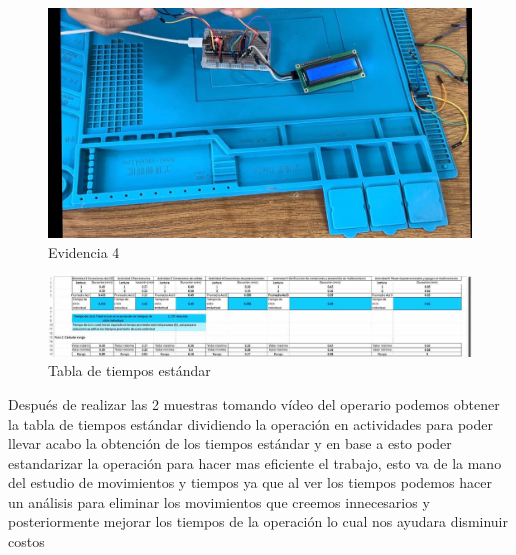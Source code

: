     \begin{figure}[H]
        \centering
        \includegraphics[trim = {0mm 0mm 0mm 0mm},clip,scale=0.2]{8/Img/Evidencia 4.pdf}
        \caption{Evidencia 4}
        \label{Evidencia 4}
    \end{figure}
    
    
    
    \begin{figure}[H]
        \centering
        \includegraphics[trim = {0mm 0mm 0mm 0mm},clip,scale=0.4]{8/Img/Tiempos estandar.pdf}
        \caption{Tabla de tiempos estándar}
        \label{Tiempos estándar}
    \end{figure}
    
    Después de realizar las 2 muestras tomando vídeo del operario podemos obtener la tabla de tiempos estándar dividiendo la operación en actividades para poder llevar acabo la obtención de los tiempos estándar y en base a esto poder estandarizar la operación para hacer mas eficiente el trabajo, esto va de la mano del estudio de movimientos y tiempos ya que al ver los tiempos podemos hacer un análisis para eliminar los movimientos que creemos innecesarios y posteriormente mejorar los tiempos de la operación lo cual nos ayudara disminuir costos 
    
